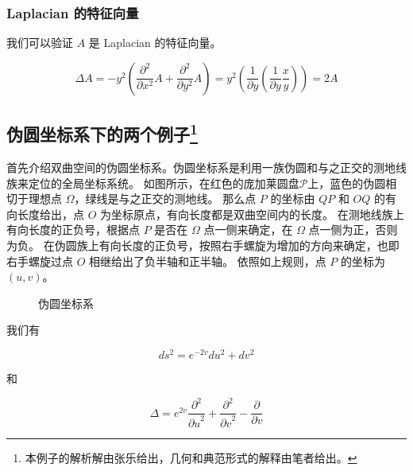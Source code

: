 \documentclass[a4paper,12pt]{article}
\numberwithin{definition}{section}
\numberwithin{lemma}{section}
\numberwithin{proposition}{section}
\numberwithin{theorem}{section}
\numberwithin{grammar}{section}
\numberwithin{program}{section}
\numberwithin{convention}{section}
\numberwithin{corollary}{section}
\begin{document}
\subsubsection{Laplacian 的特征向量}

我们可以验证 $A$ 是 Laplacian 的特征向量。

$$
\Delta A = - y^2 (\frac{\partial^2}{\partial x^2} A + \frac{\partial^2}{\partial y^2} A) = y^2 (\frac{1}{\partial y} (\frac{1}{\partial y} \frac{x}{y})) = 2 A
$$

\subsection{伪圆坐标系下的两个例子\footnote{本例子的解析解由张乐给出，几何和典范形式的解释由笔者给出。}}

首先介绍双曲空间的伪圆坐标系。伪圆坐标系是利用一族伪圆和与之正交的测地线族来定位的全局坐标系统。
如图所示，在红色的庞加莱圆盘$\mathcal{P}$上，蓝色的伪圆相切于理想点 $\Omega$，绿线是与之正交的测地线。
那么点 $P$ 的坐标由 $QP$ 和 $OQ$ 的有向长度给出，点 $O$ 为坐标原点，有向长度都是双曲空间内的长度。
在测地线族上有向长度的正负号，根据点 $P$ 是否在 $\Omega$ 点一侧来确定，在 $\Omega$ 点一侧为正，否则为负。
在伪圆族上有向长度的正负号，按照右手螺旋为增加的方向来确定，也即右手螺旋过点 $O$ 相继给出了负半轴和正半轴。
依照如上规则，点 $P$ 的坐标为 $(u,v)$。

\begin{figure}[ht]
\centering
{}
\caption{伪圆坐标系}\label{fig:horocyclecoord}
\end{figure}

我们有

$$
ds^2 = e^{-2v} du^2 + dv^2
$$

和

$$
\Delta = e^{2v} \frac{\partial^2}{{\partial u}^2} + \frac{\partial^2}{{\partial v}^2} - \frac{\partial}{\partial v}
$$
\end{document}
